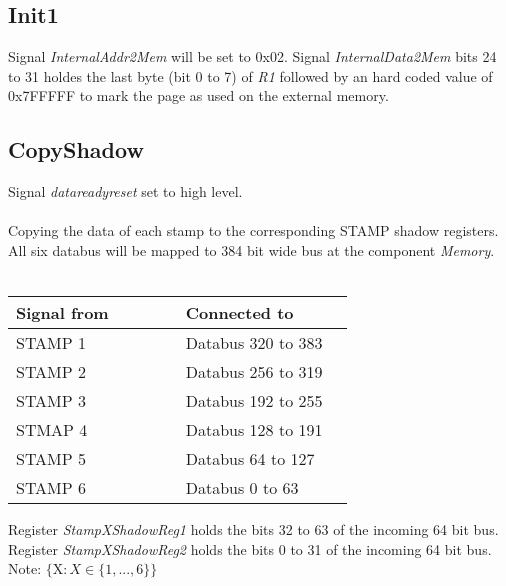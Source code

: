 \subsection{Init1} 
Signal \textit{InternalAddr2Mem} will be set to 0x02. 
Signal \textit{InternalData2Mem} bits 24 to 31 holdes the last byte (bit 0 to 7) of \textit{R1} followed by an hard coded value of 0x7FFFFF to mark the page as used on the external memory. 
\subsection{CopyShadow} 
Signal \textit{datareadyreset} set to high level.\\\\
Copying the data of each stamp to the corresponding STAMP shadow registers. \\
All six databus will be mapped to 384 bit wide bus at the component \textit{Memory}. \\\\
\begin{longtable} [htb] { | p{0.45 \linewidth} | p{0.45\linewidth} | } \hline
		\textbf{Signal from} & \textbf{Connected to} \\ \hline
\endhead
	STAMP 1 & Databus 320 to 383 \\ \hline 
	STAMP 2 & Databus 256 to 319 \\ \hline 
	STAMP 3 & Databus 192 to 255 \\ \hline
	STMAP 4 & Databus 128 to 191 \\ \hline
	STAMP 5 & Databus 64 to 127 \\ \hline
	STAMP 6 & Databus 0 to 63 \\ \hline 	
\end{longtable} 
Register \textit{StampXShadowReg1} holds the bits 32 to 63 of the incoming 64 bit bus. \\ 
Register \textit{StampXShadowReg2} holds the bits 0 to 31 of the incoming 64 bit bus. 
Note: $\{ \text{X} : \textit{X} \in  \{1, ..., 6\} \}$ 
